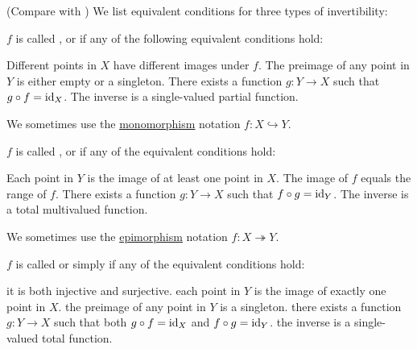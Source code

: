 \begin{definition}\label{def:function_invertibility}(Compare with )
  We list equivalent conditions for three types of invertibility:
  \begin{DefEnum}
     \( f \) is called ,  or  if any of the following equivalent conditions hold:
    \begin{DefEnum}
       Different points in \( X \) have different images under \( f \).
       The preimage of any point in \( Y \) is either empty or a singleton.
       There exists a function \( g: Y \to X \) such that \( g \circ f = \operatorname{id}_X \).
       The inverse is a single-valued partial function.
    \end{DefEnum}

    We sometimes use the \hyperref[def:morphism_invertibility/monomorphism]{monomorphism} notation \( f: X \hookrightarrow Y \).

     \( f \) is called ,  or  if any of the equivalent conditions hold:
    \begin{DefEnum}
       Each point in \( Y \) is the image of at least one point in \( X \).
       The image of \( f \) equals the range of \( f \).
       There exists a function \( g: Y \to X \) such that \( f \circ g = \operatorname{id}_Y \).
       The inverse is a total multivalued function.
    \end{DefEnum}

    We sometimes use the \hyperref[def:morphism_invertibility/epimorphism]{epimorphism} notation \( f: X \twoheadrightarrow Y \).

     \( f \) is called  or simply  if any of the equivalent conditions hold:
    \begin{DefEnum}
       it is both injective and surjective.
       each point in \( Y \) is the image of exactly one point in \( X \).
       the preimage of any point in \( Y \) is a singleton.
       there exists a function \( g: Y \to X \) such that both \( g \circ f = \operatorname{id}_X \) and \( f \circ g = \operatorname{id}_Y \).
       the inverse is a single-valued total function.
    \end{DefEnum}


\end{DefEnum}
\end{definition}
